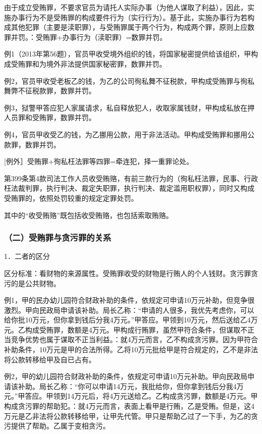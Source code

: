 由于成立受贿罪，不要求官员为请托人实际办事（为他人谋取了利益），因此，实施办事行为不是受贿罪的构成要件行为（实行行为）。基于此，实施办事行为若构成其他犯罪（主要是渎职罪），与受贿罪属于两个行为，构成两个罪，原则上应数罪并罚。：受贿罪+办事行为（渎职罪）=数罪并罚。

例1（2013年第56题），官员甲收受境外组织的钱，将国家秘密提供给该组织，甲构成受贿罪和为境外非法提供国家秘密罪，数罪并罚。

例2，官员甲收受老板乙的钱，为乙的公司徇私舞不征税款，甲构成受贿罪与徇私舞弊不征税款罪，数罪并罚。

例3，狱警甲答应犯人家属请求，私自释放犯人，收取家属钱财，甲构成私放在押人员罪和受贿罪，数罪并罚。

例4，官员甲收受乙的钱，为乙挪用公款，用于非法活动。甲构成受贿罪和挪用公款罪，数罪并罚。

[例外］受贿罪+徇私枉法罪等四罪=牵连犯，择一重罪论处。

第399条第4款司法工作人员收受贿赂，有前三款行为的（徇私枉法罪，民事、行政枉法裁判罪，执行判决、裁定失职罪，执行判决、裁定滥用职权罪），同时又构成受贿罪的，依照处罚较重的规定定罪处罚。

其中的“收受贿赂”既包括收受贿赂，也包括索取贿赂。

\subsubsection*{（二）受贿罪与贪污罪的关系}

1．二者的区分

区分标准：看财物的来源属性。受贿罪收受的财物是行贿人的个人钱财。贪污罪贪污的是公共财物。

例1，甲的民办幼儿园符合财政补助的条件，依规定可申请10万元补助，但竞争很激烈。甲向民政局申请该补助。局长乙称：“申请的人很多，我优先考虑你，可以给你批10万元，但你拿到钱后分我4万元。”甲答应。甲领到10万元，然后送给乙4万元。乙构成受贿罪，数额是4万元。甲构成行贿罪，虽然甲符合条件，但谋取不正当竞争优势也属于谋取不正当利益。：就4万元而言，乙不构成贪污罪。因为甲符合补助条件，10万元是甲的合法所得。乙将10万元批给甲是符合规定的，乙不是非法将公款转移给甲及自已占有。

例2，甲的幼儿园符合财政补助的条件，依规定可申请10万元补助。甲向民政局申请该补助。局长乙称：“你可以申请14万元，我批给你，但你拿到钱后分我4万元。”甲答应。甲领到14万元后，将4万元送给乙。乙构成贪污罪，数额是4万元。甲构成贪污罪的帮助犯。：就4万元而言，表面上看甲是行贿，乙是受贿。但是，这4万元是乙非法将公款转移给甲，让甲先代管。甲只是帮助乙过了一下手，为乙的贪污提供了帮助。乙属于变相贪污。

